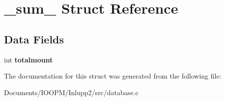\hypertarget{struct__sum__}{}\section{\+\_\+sum\+\_\+ Struct Reference}
\label{struct__sum__}
\subsection*{Data Fields}
\begin{DoxyCompactItemize}
\item 
\hypertarget{struct__sum___ae628245a3b1704096bb2100396bdc582}{}int {\bfseries totalmount}\label{struct__sum___ae628245a3b1704096bb2100396bdc582}

\end{DoxyCompactItemize}


The documentation for this struct was generated from the following file\+:\begin{DoxyCompactItemize}
\item 
Documents/\+I\+O\+O\+P\+M/\+Inlupp2/src/database.\+c\end{DoxyCompactItemize}
